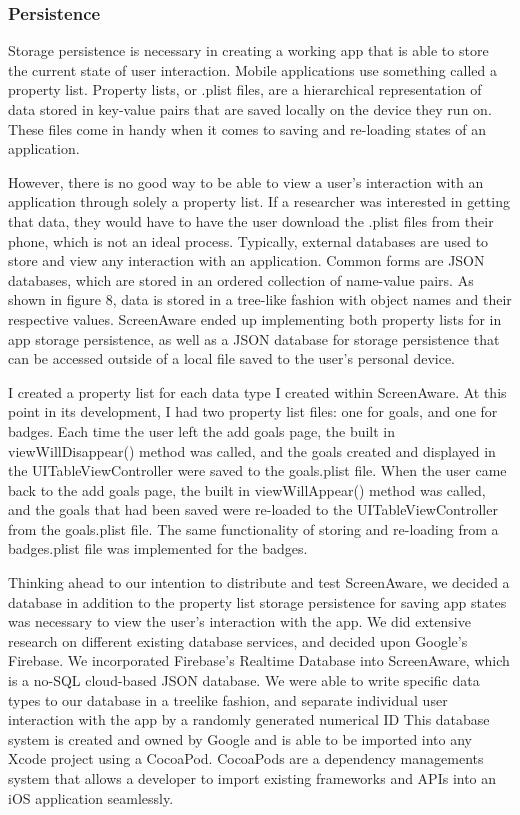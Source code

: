 \documentclass[12pt, title page, manuscript, nonacm]{acmart}
\begin{document}
\subsubsection*{Persistence}
Storage persistence is necessary in creating a working app that is able to store the current state of user interaction. Mobile applications use something called a property list. Property lists, or .plist files, are a hierarchical representation of data stored in key-value pairs that are saved locally on the device they run on. These files come in handy when it comes to saving and re-loading states of an application. 
\par However, there is no good way to be able to view a user's interaction with an application through solely a property list. If a researcher was interested in getting that data, they would have to have the user download the .plist files from their phone, which is not an ideal process. Typically, external databases are used to store and view any interaction with an application. Common forms are JSON databases, which are stored in an ordered collection of name-value pairs. As shown in figure 8, data is stored in a tree-like fashion with object names and their respective values. ScreenAware ended up implementing both property lists for in app storage persistence, as well as a JSON database for storage persistence that can be accessed outside of a local file saved to the user's personal device.
\par I created a property list for each data type I created within ScreenAware. At this point in its development, I had two property list files: one for goals, and one for badges. Each time the user left the add goals page, the built in viewWillDisappear() method was called, and the goals created and displayed in the UITableViewController were saved to the goals.plist file. When the user came back to the add goals page, the built in viewWillAppear() method was called, and the goals that had been saved were re-loaded to the UITableViewController from the goals.plist file. The same functionality of storing and re-loading from a badges.plist file was implemented for the badges.
\par Thinking ahead to our intention to distribute and test ScreenAware, we decided a database in addition to the property list storage persistence for saving app states was necessary to view the user's interaction with the app. We did extensive research on different existing database services, and decided upon Google's Firebase. We incorporated Firebase's Realtime Database into ScreenAware, which is a no-SQL cloud-based JSON database. We were able to write specific data types to our database in a treelike fashion, and separate individual user interaction with the app by a randomly generated numerical ID\cite{prasad2017enact} This database system is created and owned by Google and is able to be imported into any Xcode project using a CocoaPod. CocoaPods are a dependency managements system that allows a developer to import existing frameworks and APIs into an iOS application seamlessly. 
\end{document}
